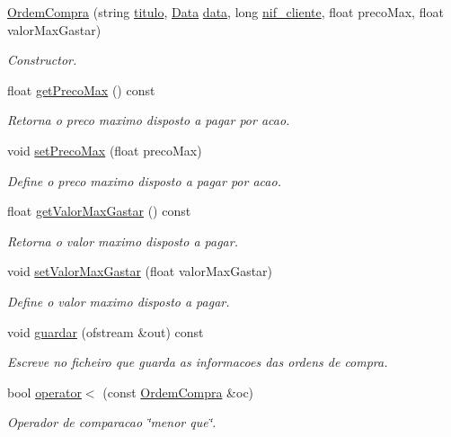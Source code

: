 \begin{DoxyCompactItemize}
\item 
\hyperlink{class_ordem_compra_a98bff4c9185593d197e72a7f14e5856f}{Ordem\+Compra} (string \hyperlink{class_ordem_a0773861bd9fb956d5ec62f2ef1de658b}{titulo}, \hyperlink{class_data}{Data} \hyperlink{class_ordem_a9f4dbc2966e98dcbd7e300ae346d8535}{data}, long \hyperlink{class_ordem_af6d06b4250735ae531bdcef5fa332f02}{nif\+\_\+cliente}, float preco\+Max, float valor\+Max\+Gastar)
\begin{DoxyCompactList}\small\item\em Constructor. \end{DoxyCompactList}\item 
float \hyperlink{class_ordem_compra_a2c4117480fead3d38c34e7491007503d}{get\+Preco\+Max} () const
\begin{DoxyCompactList}\small\item\em Retorna o preco maximo disposto a pagar por acao. \end{DoxyCompactList}\item 
void \hyperlink{class_ordem_compra_aab6b393722db7f13fa0c37eddb1b4b04}{set\+Preco\+Max} (float preco\+Max)
\begin{DoxyCompactList}\small\item\em Define o preco maximo disposto a pagar por acao. \end{DoxyCompactList}\item 
float \hyperlink{class_ordem_compra_a29931277d9029de1cb8a176694f38085}{get\+Valor\+Max\+Gastar} () const
\begin{DoxyCompactList}\small\item\em Retorna o valor maximo disposto a pagar. \end{DoxyCompactList}\item 
void \hyperlink{class_ordem_compra_ada9283bb3eda59fd0f6b10aa7e2b86c2}{set\+Valor\+Max\+Gastar} (float valor\+Max\+Gastar)
\begin{DoxyCompactList}\small\item\em Define o valor maximo disposto a pagar. \end{DoxyCompactList}\item 
void \hyperlink{class_ordem_compra_ae4c663bb3b6d507fabc7d02fa244cd56}{guardar} (ofstream \&out) const
\begin{DoxyCompactList}\small\item\em Escreve no ficheiro que guarda as informacoes das ordens de compra. \end{DoxyCompactList}\item 
bool \hyperlink{class_ordem_compra_a9f72d876fc98d74bc5451c735dc6b84d}{operator$<$} (const \hyperlink{class_ordem_compra}{Ordem\+Compra} \&oc)
\begin{DoxyCompactList}\small\item\em Operador de comparacao \char`\"{}menor que\char`\"{}. \end{DoxyCompactList}\end{DoxyCompactItemize}
